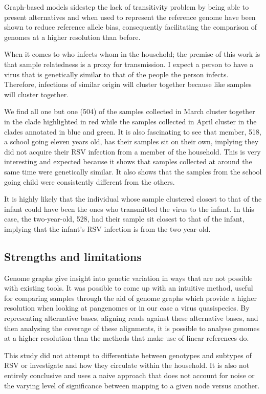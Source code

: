 \documentclass[10pt, a4paper]{article}
\begin{document}
Graph-based models sidestep the lack of transitivity problem by being able to
present alternatives and when used to represent the reference genome have been
shown to reduce reference allele bias, consequently facilitating the comparison
of genomes at a higher resolution than before.

When it comes to who infects whom in the household; the premise of this work is
that sample relatedness is a proxy for transmission.
I expect a person to have a virus that is genetically similar to that of the
people the person infects. Therefore, infections of similar origin will cluster
together because like samples will cluster together.

We find all one but one (504) of the samples collected in March cluster together
in the clade highlighted in red while the samples collected in April cluster in
the clades annotated in blue and green. It is also fascinating to see that
member, 518, a school going eleven years old, has their samples sit on their
own, implying they did not acquire their RSV infection from a member of the
household. This is very interesting and expected because it shows that samples
collected at around the same time were genetically similar.
It also shows that the samples from the school going child were consistently
different from the others.

It is highly likely that the individual whose sample clustered closest to that
of the infant could have been the ones who transmitted the virus to the infant.
In this case, the two-year-old, 528, had their sample sit closest to that of the
infant, implying that the infant's RSV infection is from the two-year-old.

\subsection{Strengths and limitations}
\label{sec:orgb61f36a}
Genome graphs give insight into genetic variation in ways that are not possible
with existing tools.
It was possible to come up with an intuitive method, useful for comparing
samples through the aid of genome graphs which provide a higher resolution when
looking at pangenomes or in our case a virus quasispecies. By representing
alternative bases, aligning reads against these alternative bases, and then
analysing the coverage of these alignments, it is possible to analyse genomes at
a higher resolution than the methods that make use of linear references do.

This study did not attempt to differentiate between genotypes and subtypes of
RSV or investigate and how they circulate within the household.
It is also not entirely conclusive and uses a naive approach that does not
account for noise or the varying level of significance between mapping to a
given node versus another.
\end{document}
